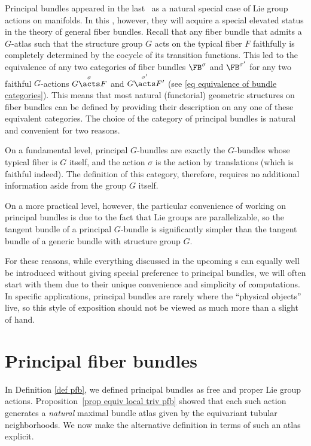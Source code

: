     Principal bundles appeared in the last \chap\ as a natural special case of Lie group actions on manifolds. In this \chap, however, they will acquire a special elevated status in the theory of general fiber bundles. Recall that any fiber bundle that admits a $G$-atlas such that the structure group $G$ acts on the typical fiber $F$ faithfully is completely determined by the cocycle of its transition functions. This led to the equivalence of any two categories of fiber bundles $\FB^\sigma$ and $\FB^{\sigma'}$ for any two faithful $G$-actions $G\overset{\sigma}{\acts}F$ and $G\overset{\sigma'}{\acts}F'$ (see \eqref{eq equivalence of bundle categories}). This means that most natural (functorial) geometric structures on fiber bundles can be defined by providing their description on any one of these equivalent categories. The choice of the category of principal bundles is natural and convenient for two reasons. 
    
    On a fundamental level, principal $G$-bundles are exactly the $G$-bundles whose typical fiber is $G$ itself, and the action $\sigma$ is the action by translations (which is faithful indeed). The definition of this category, therefore, requires no additional information aside from the group $G$ itself. 
    
    On a more practical level, however, the particular convenience of working on principal bundles is due to the fact that Lie groups are parallelizable, so the tangent bundle of a principal $G$-bundle is significantly simpler than the tangent bundle of a generic bundle with structure group $G$. 

    For these reasons, while everything discussed in the upcoming \chap s can equally well be introduced without giving special preference to principal bundles, we will often start with them due to their unique convenience and simplicity of computations. In specific applications, principal bundles are rarely where the ``physical objects'' live, so this style of exposition should not be viewed as much more than a slight of hand.



\section{Principal fiber bundles}\label{sec: principal bundles}


In Definition \ref{def pfb}, we defined principal bundles as free and proper Lie group actions. Proposition~\ref{prop equiv local triv pfb} showed that each such action generates a \emph{natural} maximal bundle atlas given by the equivariant tubular neighborhoods. We now make the alternative definition in terms of such an atlas explicit.

